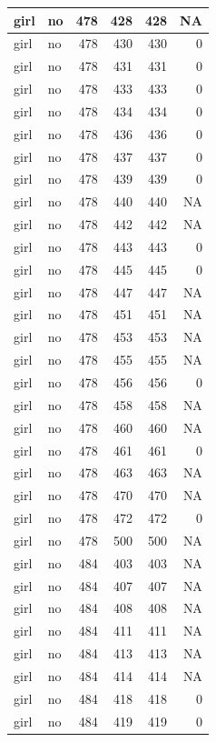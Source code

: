 \documentclass[man]{apa6}
\begin{document}
\begin{tabular}{l|l|r|r|r|r}
\hline
girl & no & 478 & 428 & 428 & NA\\
\hline
girl & no & 478 & 430 & 430 & 0\\
\hline
girl & no & 478 & 431 & 431 & 0\\
\hline
girl & no & 478 & 433 & 433 & 0\\
\hline
girl & no & 478 & 434 & 434 & 0\\
\hline
girl & no & 478 & 436 & 436 & 0\\
\hline
girl & no & 478 & 437 & 437 & 0\\
\hline
girl & no & 478 & 439 & 439 & 0\\
\hline
girl & no & 478 & 440 & 440 & NA\\
\hline
girl & no & 478 & 442 & 442 & NA\\
\hline
girl & no & 478 & 443 & 443 & 0\\
\hline
girl & no & 478 & 445 & 445 & 0\\
\hline
girl & no & 478 & 447 & 447 & NA\\
\hline
girl & no & 478 & 451 & 451 & NA\\
\hline
girl & no & 478 & 453 & 453 & NA\\
\hline
girl & no & 478 & 455 & 455 & NA\\
\hline
girl & no & 478 & 456 & 456 & 0\\
\hline
girl & no & 478 & 458 & 458 & NA\\
\hline
girl & no & 478 & 460 & 460 & NA\\
\hline
girl & no & 478 & 461 & 461 & 0\\
\hline
girl & no & 478 & 463 & 463 & NA\\
\hline
girl & no & 478 & 470 & 470 & NA\\
\hline
girl & no & 478 & 472 & 472 & 0\\
\hline
girl & no & 478 & 500 & 500 & NA\\
\hline
girl & no & 484 & 403 & 403 & NA\\
\hline
girl & no & 484 & 407 & 407 & NA\\
\hline
girl & no & 484 & 408 & 408 & NA\\
\hline
girl & no & 484 & 411 & 411 & NA\\
\hline
girl & no & 484 & 413 & 413 & NA\\
\hline
girl & no & 484 & 414 & 414 & NA\\
\hline
girl & no & 484 & 418 & 418 & 0\\
\hline
girl & no & 484 & 419 & 419 & 0\\

\end{tabular}
\end{document}
